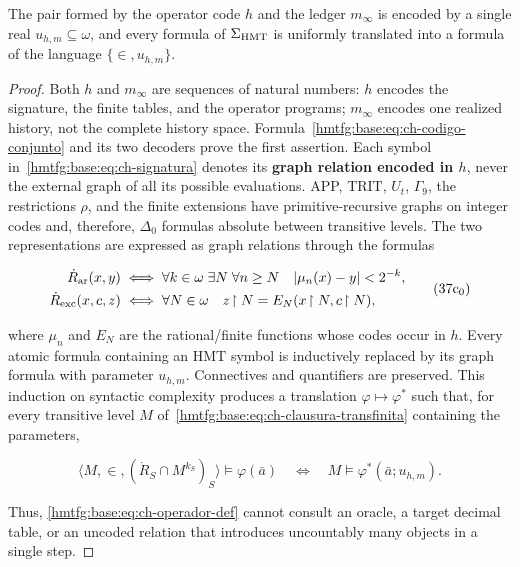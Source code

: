 \begin{lemma}
\label{hmtfg:base:thm:ch-6}
The pair formed by the operator code \(h\) and the ledger \(m_\infty\) is
encoded by a single real \(u_{h,m}\subseteq\omega\), and every formula of
\(\Sigma_{\rm HMT}\) is uniformly translated into a formula of the language
\(\{\in,u_{h,m}\}\).

\end{lemma}
\begin{proof}
Both \(h\) and \(m_\infty\) are sequences of natural numbers: \(h\) encodes
the signature, the finite tables, and the operator programs; \(m_\infty\)
encodes one realized history, not the complete history space.
Formula~\eqref{hmtfg:base:eq:ch-codigo-conjunto} and its two decoders prove the first
assertion. Each symbol in~\eqref{hmtfg:base:eq:ch-signatura} denotes its \textbf{graph
relation encoded in \(h\)}, never the external graph of all its possible
evaluations. APP, TRIT, \(U_t\), \(\Gamma_9\), the restrictions \(\rho\), and
the finite extensions have primitive-recursive graphs on integer codes and,
therefore, \(\Delta_0\) formulas absolute between transitive levels. The two
representations are expressed as graph relations through the formulas

\[
 \begin{aligned}
 \dot R_{\rm ar}(x,y)
 &\;\Longleftrightarrow\;
 \forall k\in\omega\;\exists N\;\forall n\ge N\quad
 |\mu_n(x)-y|<2^{-k},\\
 \dot R_{\rm exc}(x,c,z)
 &\;\Longleftrightarrow\;
 \forall N\in\omega\quad z\!\upharpoonright N
   =E_N(x\!\upharpoonright N,c\!\upharpoonright N),
 \end{aligned}
\tag{37c$_0$}\label{hmtfg:base:eq:ch-grafos-publicacion}
\]

where \(\mu_n\) and \(E_N\) are the rational/finite functions whose codes
occur in \(h\). Every atomic formula containing an HMT symbol is inductively
replaced by its graph formula with parameter \(u_{h,m}\). Connectives and
quantifiers are preserved. This induction on syntactic complexity produces a
translation \(\varphi\mapsto\varphi^*\) such that, for every transitive level
\(M\) of~\eqref{hmtfg:base:eq:ch-clausura-transfinita} containing the parameters,

\[
 \langle M,\in,(\dot R_S\cap M^{k_S})_S\rangle
   \models\varphi(\bar a)
 \quad\Longleftrightarrow\quad
 M\models\varphi^*(\bar a;u_{h,m}).
\tag{37c}\label{hmtfg:base:eq:ch-eliminacion-uniforme}
\]

Thus, \eqref{hmtfg:base:eq:ch-operador-def} cannot consult an oracle, a target decimal
table, or an uncoded relation that introduces uncountably many objects in a
single step.
\end{proof}

